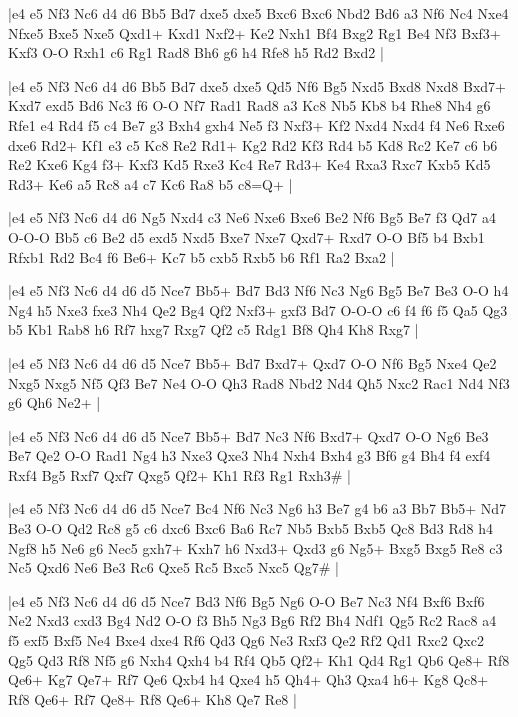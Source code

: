 \whitename{}
\blackname{}
\makegametitle
|e4 e5 Nf3 Nc6 d4 d6 Bb5 Bd7 dxe5 dxe5 Bxc6 Bxc6 Nbd2 Bd6 a3 Nf6 Nc4 Nxe4 Nfxe5 Bxe5 Nxe5 Qxd1+ Kxd1 Nxf2+ Ke2 Nxh1 Bf4 Bxg2 Rg1 Be4 Nf3 Bxf3+ Kxf3 O-O Rxh1 c6 Rg1 Rad8 Bh6 g6 h4 Rfe8 h5 Rd2 Bxd2  |

\whitename{}
\blackname{}
\makegametitle
|e4 e5 Nf3 Nc6 d4 d6 Bb5 Bd7 dxe5 dxe5 Qd5 Nf6 Bg5 Nxd5 Bxd8 Nxd8 Bxd7+ Kxd7 exd5 Bd6 Nc3 f6 O-O Nf7 Rad1 Rad8 a3 Kc8 Nb5 Kb8 b4 Rhe8 Nh4 g6 Rfe1 e4 Rd4 f5 c4 Be7 g3 Bxh4 gxh4 Ne5 f3 Nxf3+ Kf2 Nxd4 Nxd4 f4 Ne6 Rxe6 dxe6 Rd2+ Kf1 e3 c5 Kc8 Re2 Rd1+ Kg2 Rd2 Kf3 Rd4 b5 Kd8 Rc2 Ke7 c6 b6 Re2 Kxe6 Kg4 f3+ Kxf3 Kd5 Rxe3 Kc4 Re7 Rd3+ Ke4 Rxa3 Rxc7 Kxb5 Kd5 Rd3+ Ke6 a5 Rc8 a4 c7 Kc6 Ra8 b5 c8=Q+  |

\whitename{}
\blackname{}
\makegametitle
|e4 e5 Nf3 Nc6 d4 d6 Ng5 Nxd4 c3 Ne6 Nxe6 Bxe6 Be2 Nf6 Bg5 Be7 f3 Qd7 a4 O-O-O Bb5 c6 Be2 d5 exd5 Nxd5 Bxe7 Nxe7 Qxd7+ Rxd7 O-O Bf5 b4 Bxb1 Rfxb1 Rd2 Bc4 f6 Be6+ Kc7 b5 cxb5 Rxb5 b6 Rf1 Ra2 Bxa2  |

\whitename{}
\blackname{}
\makegametitle
|e4 e5 Nf3 Nc6 d4 d6 d5 Nce7 Bb5+ Bd7 Bd3 Nf6 Nc3 Ng6 Bg5 Be7 Be3 O-O h4 Ng4 h5 Nxe3 fxe3 Nh4 Qe2 Bg4 Qf2 Nxf3+ gxf3 Bd7 O-O-O c6 f4 f6 f5 Qa5 Qg3 b5 Kb1 Rab8 h6 Rf7 hxg7 Rxg7 Qf2 c5 Rdg1 Bf8 Qh4 Kh8 Rxg7  |

\whitename{}
\blackname{}
\makegametitle
|e4 e5 Nf3 Nc6 d4 d6 d5 Nce7 Bb5+ Bd7 Bxd7+ Qxd7 O-O Nf6 Bg5 Nxe4 Qe2 Nxg5 Nxg5 Nf5 Qf3 Be7 Ne4 O-O Qh3 Rad8 Nbd2 Nd4 Qh5 Nxc2 Rac1 Nd4 Nf3 g6 Qh6 Ne2+  |

\whitename{}
\blackname{}
\makegametitle
|e4 e5 Nf3 Nc6 d4 d6 d5 Nce7 Bb5+ Bd7 Nc3 Nf6 Bxd7+ Qxd7 O-O Ng6 Be3 Be7 Qe2 O-O Rad1 Ng4 h3 Nxe3 Qxe3 Nh4 Nxh4 Bxh4 g3 Bf6 g4 Bh4 f4 exf4 Rxf4 Bg5 Rxf7 Qxf7 Qxg5 Qf2+ Kh1 Rf3 Rg1 Rxh3\#  |

\whitename{}
\blackname{}
\makegametitle
|e4 e5 Nf3 Nc6 d4 d6 d5 Nce7 Bc4 Nf6 Nc3 Ng6 h3 Be7 g4 b6 a3 Bb7 Bb5+ Nd7 Be3 O-O Qd2 Rc8 g5 c6 dxc6 Bxc6 Ba6 Rc7 Nb5 Bxb5 Bxb5 Qc8 Bd3 Rd8 h4 Ngf8 h5 Ne6 g6 Nec5 gxh7+ Kxh7 h6 Nxd3+ Qxd3 g6 Ng5+ Bxg5 Bxg5 Re8 c3 Nc5 Qxd6 Ne6 Be3 Rc6 Qxe5 Rc5 Bxc5 Nxc5 Qg7\#  |

\whitename{}
\blackname{}
\makegametitle
|e4 e5 Nf3 Nc6 d4 d6 d5 Nce7 Bd3 Nf6 Bg5 Ng6 O-O Be7 Nc3 Nf4 Bxf6 Bxf6 Ne2 Nxd3 cxd3 Bg4 Nd2 O-O f3 Bh5 Ng3 Bg6 Rf2 Bh4 Ndf1 Qg5 Rc2 Rac8 a4 f5 exf5 Bxf5 Ne4 Bxe4 dxe4 Rf6 Qd3 Qg6 Ne3 Rxf3 Qe2 Rf2 Qd1 Rxc2 Qxc2 Qg5 Qd3 Rf8 Nf5 g6 Nxh4 Qxh4 b4 Rf4 Qb5 Qf2+ Kh1 Qd4 Rg1 Qb6 Qe8+ Rf8 Qe6+ Kg7 Qe7+ Rf7 Qe6 Qxb4 h4 Qxe4 h5 Qh4+ Qh3 Qxa4 h6+ Kg8 Qc8+ Rf8 Qe6+ Rf7 Qe8+ Rf8 Qe6+ Kh8 Qe7 Re8  |


